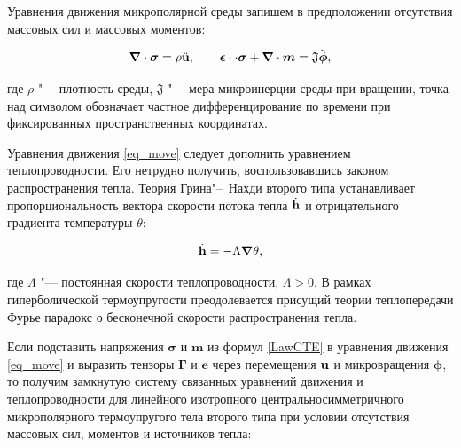 Уравнения движения микрополярной среды запишем в предположении отсутствия массовых сил и массовых моментов:

\begin{equation}

\boldsymbol{\nabla}\cdot {\boldsymbol{\sigma}} =  {\rho} \ddot{{\bf u}}, \qquad 

\boldsymbol{\epsilon} \cdot\cdot {\boldsymbol{\sigma}} +\boldsymbol{\nabla}\cdot{\boldsymbol{m}}= {\mathfrak J} \ddot{{\boldsymbol\phi}},

\label{eq_move}

\end{equation}

где $\rho$ "--- плотность среды, $\mathfrak J$ "--- мера микроинерции среды при вращении, точка над символом обозначает частное дифференцирование по времени при фиксированных пространственных координатах.



Уравнения движения \eqref{eq_move} следует дополнить уравнением теплопроводности. Его нетрудно получить, воспользовавшись законом распространения тепла. Теория Грина"--~Нахди второго типа \cite{MurashkinRadayev:bib:GreenNaghdi1992, MurashkinRadayev:bib:GreenNaghdi1993} устанавливает пропорциональность вектора скорости потока тепла $\dot{\bf{h}}$  и отрицательного градиента температуры $\theta$:

$$

\dot{\bf{h}}=-\Lambda \boldsymbol{\nabla}\theta,

$$

где $\Lambda$ "--- постоянная скорости теплопроводности, $\Lambda>0$. В рамках гиперболической термоупругости преодолевается присущий теории теплопередачи Фурье парадокс о бесконечной скорости распространения тепла.



Если подставить напряжения $\boldsymbol{\sigma}$ и $\boldsymbol{m}$ из формул \eqref{LawCTE} в уравнения движения \eqref{eq_move} и выразить тензоры  $\boldsymbol{\Gamma}$ и  $\boldsymbol{e}$ через перемещения $\bf{u}$ и микровращения ${\boldsymbol\phi}$, то получим {\rm замкнутую} систему связанных уравнений движения  и теплопроводности для линейного изотропного центральносимметричного микрополярного термоупругого тела второго типа  при условии отсутствия массовых сил, моментов и источников тепла:

